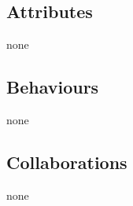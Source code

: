 \documentclass{report}
\begin{document}
\subsection{Attributes}

\begin{dashed}
    \item none
\end{dashed}

\subsection{Behaviours}

\begin{dashed}
    \item none
\end{dashed}

\subsection{Collaborations}

\begin{dashed}
    \item none
\end{dashed}
\end{document}
